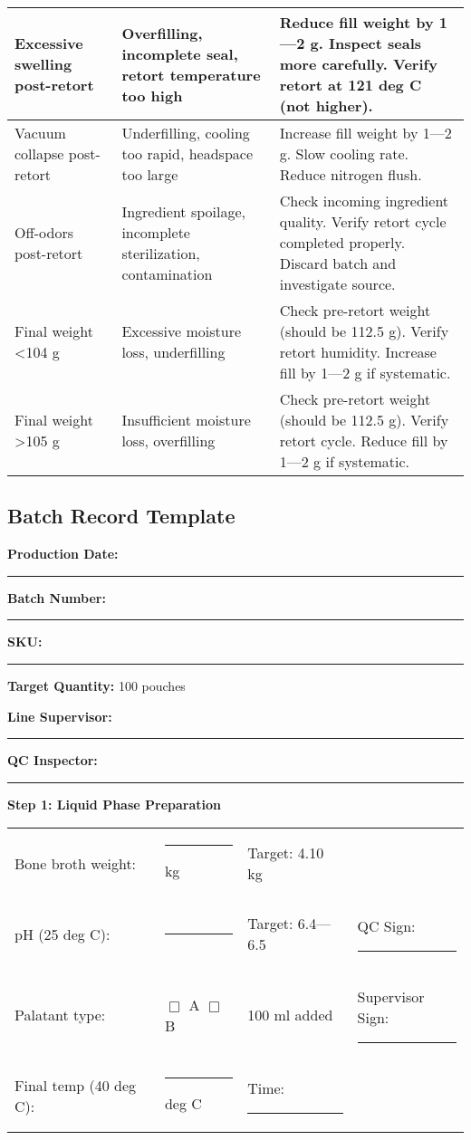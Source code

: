 {\begin{table}[h]
\begin{tabular}{@{}p{4cm}p{3.5cm}p{5cm}@{}}
Excessive swelling post-retort & Overfilling, incomplete seal, retort temperature too high & Reduce fill weight by 1---2 g.
Inspect seals more carefully. Verify retort at 121 deg C (not higher).
\\
\midrule
Vacuum collapse post-retort & Underfilling, cooling too rapid, headspace too large & Increase fill weight by 1---2 g.
Slow cooling rate. Reduce nitrogen flush. \\
\midrule
Off-odors post-retort & Ingredient spoilage, incomplete sterilization, contamination & Check incoming ingredient quality.
Verify retort cycle completed properly. Discard batch and investigate source.
\\
\midrule
Final weight <104 g & Excessive moisture loss, underfilling & Check pre-retort weight (should be 112.5 g). Verify retort humidity.
Increase fill by 1---2 g if systematic. \\
\midrule
Final weight >105 g & Insufficient moisture loss, overfilling & Check pre-retort weight (should be 112.5 g).
Verify retort cycle. Reduce fill by 1---2 g if systematic.
\\
\bottomrule
\end{tabular}
\end{table}


\clearpage
\subsection*{Batch Record Template}

\noindent\textbf{Production Date:} \rule{3cm}{0.4pt} \hspace{2cm} \textbf{Batch Number:} \rule{3cm}{0.4pt}

\noindent\textbf{SKU:} \rule{4cm}{0.4pt} \hspace{2cm} \textbf{Target Quantity:} 100 pouches

\noindent\textbf{Line Supervisor:} \rule{4cm}{0.4pt} \hspace{1cm} \textbf{QC Inspector:} \rule{4cm}{0.4pt}

\vspace{1em}

\noindent\textbf{Step 1: Liquid Phase Preparation}

\begin{tabular}{@{}lp{3cm}p{3cm}p{3cm}@{}}
Bone broth weight: & \rule{2.5cm}{0.4pt} kg & Target: 4.10 kg & \\
pH (25 deg C): & \rule{2.5cm}{0.4pt} & Target: 6.4---6.5 & QC Sign: \rule{2cm}{0.4pt} \\
Palatant type: & $\Box$ A $\Box$ B & 100 ml added & Supervisor Sign: \rule{2cm}{0.4pt} \\
Final temp (40 deg C): & \rule{2.5cm}{0.4pt} deg C & Time: \rule{2cm}{0.4pt} & \\
\end{tabular}

}
